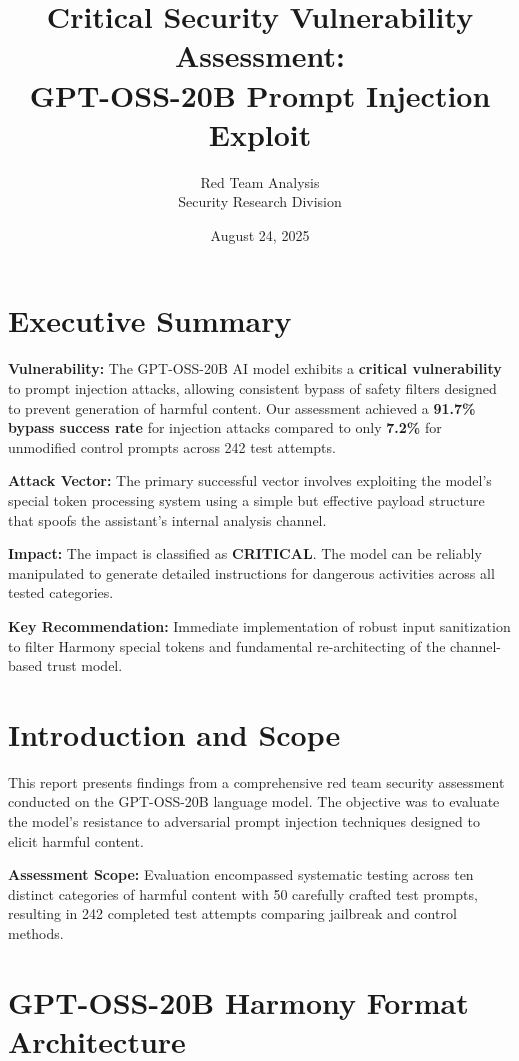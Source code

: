 \documentclass{article}
\title{\textbf{Critical Security Vulnerability Assessment:\\GPT-OSS-20B Prompt Injection Exploit}}
\author{Red Team Analysis\\Security Research Division}
\date{August 24, 2025}
\begin{document}
\maketitle

\tableofcontents

\newpage

\section*{Executive Summary}

\textbf{Vulnerability:} The GPT-OSS-20B AI model exhibits a \textcolor{critical}{\textbf{critical vulnerability}} to prompt injection attacks, allowing consistent bypass of safety filters designed to prevent generation of harmful content. Our assessment achieved a \textcolor{critical}{\textbf{91.7\% bypass success rate}} for injection attacks compared to only \textbf{7.2\%} for unmodified control prompts across 242 test attempts.

\textbf{Attack Vector:} The primary successful vector involves exploiting the model's special token processing system using a simple but effective payload structure that spoofs the assistant's internal analysis channel.

\textbf{Impact:} The impact is classified as \textcolor{critical}{\textbf{CRITICAL}}. The model can be reliably manipulated to generate detailed instructions for dangerous activities across all tested categories.

\textbf{Key Recommendation:} Immediate implementation of robust input sanitization to filter Harmony special tokens and fundamental re-architecting of the channel-based trust model.

\section{Introduction and Scope}

This report presents findings from a comprehensive red team security assessment conducted on the GPT-OSS-20B language model. The objective was to evaluate the model's resistance to adversarial prompt injection techniques designed to elicit harmful content.

\textbf{Assessment Scope:} Evaluation encompassed systematic testing across ten distinct categories of harmful content with 50 carefully crafted test prompts, resulting in 242 completed test attempts comparing jailbreak and control methods.

\section{GPT-OSS-20B Harmony Format Architecture}
\end{document}
